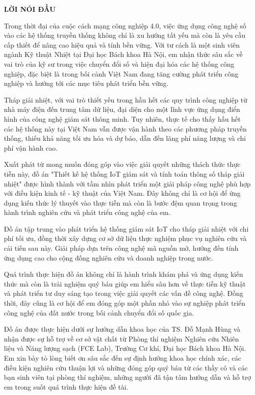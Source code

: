 \documentclass[../main.tex]{subfiles}
\begin{document}
\begin{center}
    \Large{\textbf{LỜI NÓI ĐẦU}}\\
\end{center}
\vspace{1cm}

Trong thời đại của cuộc cách mạng công nghiệp 4.0, việc ứng dụng công nghệ số vào các hệ thống truyền thống không chỉ là xu hướng tất yếu mà còn là yêu cầu cấp thiết để nâng cao hiệu quả và tính bền vững. Với tư cách là một sinh viên ngành Kỹ thuật Nhiệt tại Đại học Bách khoa Hà Nội, em nhận thức sâu sắc về vai trò của kỹ sư trong việc chuyển đổi số và hiện đại hóa các hệ thống công nghiệp, đặc biệt là trong bối cảnh Việt Nam đang tăng cường phát triển công nghiệp và hướng tới các mục tiêu phát triển bền vững.

Tháp giải nhiệt, với vai trò thiết yếu trong hầu hết các quy trình công nghiệp từ nhà máy điện đến trung tâm dữ liệu, đại diện cho một lĩnh vực ứng dụng điển hình của công nghệ giám sát thông minh. Tuy nhiên, thực tế cho thấy hầu hết các hệ thống này tại Việt Nam vẫn được vận hành theo các phương pháp truyền thống, thiếu khả năng tối ưu hóa và dự báo, dẫn đến lãng phí năng lượng và chi phí vận hành cao.

Xuất phát từ mong muốn đóng góp vào việc giải quyết những thách thức thực tiễn này, đồ án "Thiết kế hệ thống IoT giám sát và tính toán thông số tháp giải nhiệt" được hình thành với tầm nhìn phát triển một giải pháp công nghệ phù hợp với điều kiện kinh tế - kỹ thuật của Việt Nam. Đây không chỉ là cơ hội để ứng dụng kiến thức lý thuyết vào thực tiễn mà còn là bước đệm quan trọng trong hành trình nghiên cứu và phát triển công nghệ của em.

Đồ án tập trung vào phát triển hệ thống giám sát IoT cho tháp giải nhiệt với chi phí tối ưu, đồng thời xây dựng cơ sở dữ liệu thực nghiệm phục vụ nghiên cứu và cải tiến sau này. Giải pháp dựa trên công nghệ mã nguồn mở, hướng đến tính ứng dụng cao cho cộng đồng nghiên cứu và doanh nghiệp trong nước.

Quá trình thực hiện đồ án không chỉ là hành trình khám phá và ứng dụng kiến thức mà còn là trải nghiệm quý báu giúp em hiểu sâu hơn về thực tiễn kỹ thuật và phát triển tư duy sáng tạo trong việc giải quyết các vấn đề công nghệ. Đồng thời, đây cũng là cơ hội để em đóng góp một phần nhỏ vào sự nghiệp phát triển công nghệ của đất nước trong bối cảnh chuyển đổi số quốc gia.

Đồ án được thực hiện dưới sự hướng dẫn khoa học của TS. Đỗ Mạnh Hùng và nhận được sự hỗ trợ về cơ sở vật chất từ Phòng thí nghiệm Nghiên cứu Nhiên liệu và Năng lượng sạch (FCE Lab), Trường Cơ khí, Đại học Bách khoa Hà Nội. Em xin bày tỏ lòng biết ơn sâu sắc đến sự định hướng khoa học chính xác, các điều kiện nghiên cứu thuận lợi và những đóng góp quý báu từ các thầy cô và các bạn sinh viên tại phòng thí nghiệm, những người đã tận tâm hướng dẫn và hỗ trợ em trong suốt quá trình thực hiện đề tài.
\end{document}
